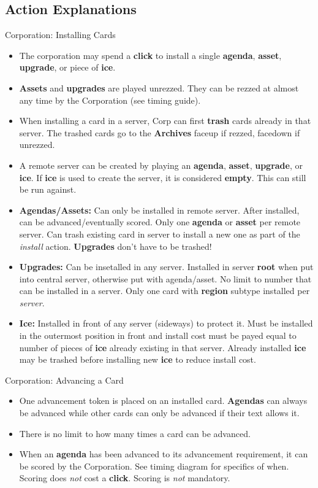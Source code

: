 \documentclass[12pt]{article}
\newenvironment{itemizeCustom}
{\begin{itemize}
  \setlength{\itemsep}{1pt}
  \setlength{\parskip}{0pt}
  \setlength{\parsep}{0pt}}
{\end{itemize}}
\begin{document}
\begin{multicols*}{2}
\section*{Action Explanations}
Corporation: Installing Cards
\begin{itemizeCustom}
\item The corporation may spend a \textbf{click} to install a single \textbf{agenda}, \textbf{asset}, \textbf{upgrade}, or piece of \textbf{ice}. 
\item \textbf{Assets} and \textbf{upgrades} are played unrezzed. They can be rezzed at almost any time by the Corporation (see timing guide).
\item When installing a card in a server, Corp can first \textbf{trash} cards already in that server. The trashed cards go to the \textbf{Archives} faceup if rezzed, facedown if unrezzed.
\item A remote server can be created by playing an \textbf{agenda}, \textbf{asset}, \textbf{upgrade}, or \textbf{ice}. If \textbf{ice} is used to create the server, it is considered \textbf{empty}. This can still be run against.
\item \textbf{Agendas/Assets:} Can only be installed in remote server. After installed, can be advanced/eventually scored. Only one \textbf{agenda} or \textbf{asset} per remote server. Can trash existing card in server to install a new one as part of the \emph{install} action. \textbf{Upgrades} don't have to be trashed!
\item \textbf{Upgrades:} Can be insetalled in any server. Installed in server \textbf{root} when put into central server, otherwise put with agenda/asset. No limit to number that can be installed in a server. Only one card with \textbf{region} subtype installed per \emph{server}.
\item \textbf{Ice:} Installed in front of any server (sideways) to protect it. Must be installed in the outermost position in front and install cost must be payed equal to number of pieces of \textbf{ice} already existing in that server. Already installed \textbf{ice} may be trashed before installing new \textbf{ice} to reduce install cost.
\end{itemizeCustom}
Corporation: Advancing a Card
\begin{itemizeCustom}
\item One advancement token is placed on an installed card. \textbf{Agendas} can always be advanced while other cards can only be advanced if their text allows it. 
\item There is no limit to how many times a card can be advanced. 
\item When an \textbf{agenda} has been advanced to its advancement requirement, it can be scored by the Corporation. See timing diagram for specifics of when. Scoring does \emph{not} cost a \textbf{click}. Scoring is \emph{not} mandatory.
\end{itemizeCustom}

\end{multicols*}
\end{document}
